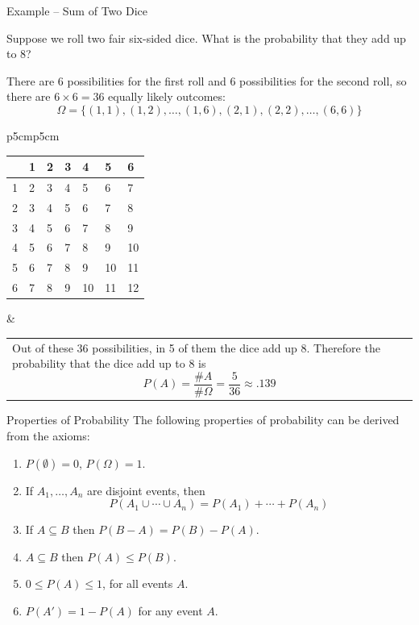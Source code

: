 \documentclass[xcolor=table]{beamer}
\begin{document}
\begin{frame}{Example -- Sum of Two Dice}
\begin{problem}Suppose we roll two fair six-sided dice. What is the probability that they add up to 8?
\end{problem}

\pause\vspace{.5cm}There are 6 possibilities for the first roll and 6 possibilities for the second roll, so there are $6 \times 6 = 36$ equally likely outcomes:
$$\Omega=\{(1,1),(1,2),\dots,(1,6),(2,1),(2,2),\dots,(6,6)\}$$
\begin{tabular}{p{5cm}p{5cm}}
\begin{tabular}{l||p{.3cm}|p{.3cm}|p{.3cm}|p{.3cm}|p{.3cm}|p{.3cm}|}
& 1 & 2 & 3 & 4 & 5 & 6 \\ \hline \hline
1& 2 & 3 & 4 & 5 & 6 & 7 \\ \hline
2& 3 & 4 & 5 & 6 & 7 & \cellcolor{gray!15}8  \\ \hline
3& 4 & 5 & 6 & 7 & \cellcolor{gray!15}8 & 9 \\ \hline
4& 5 & 6 & 7 & \cellcolor{gray!15}8 & 9 & 10\\ \hline
5& 6 & 7 & \cellcolor{gray!15}8 & 9 & 10 & 11\\ \hline
6& 7 & \cellcolor{gray!15}8 & 9 & 10 & 11 & 12\\ \hline
\end{tabular}
& 
\begin{tabular}{p{5cm}}Out of these 36 possibilities, in 5 of them the dice add up 8. Therefore the probability that the dice add up to 8 is
$$P(A) = \frac{\# A}{\# \Omega} = \frac5{36} \approx .139$$
\end{tabular}
\end{tabular}
\end{frame}

\begin{frame}{Properties of Probability}
The following properties of probability can be derived from the axioms:
\begin{enumerate}
\item $P(\emptyset)=0$, $P(\Omega)=1$.
\item If $A_1, \dots, A_n$ are disjoint events, then 
$$P(A_1 \cup \cdots \cup A_n)=P(A_1)+\cdots+P(A_n)$$ 
\item If $A \subseteq B$ then $P(B - A) = P(B)-P(A)$.
\item $A \subseteq B$ then $P(A) \leq P(B)$.
\item $0 \leq P(A) \leq 1$, for all events $A$.
\item $P(A') = 1-P(A)$ for any event $A$.
\end{enumerate}
\end{frame}
\end{document}
